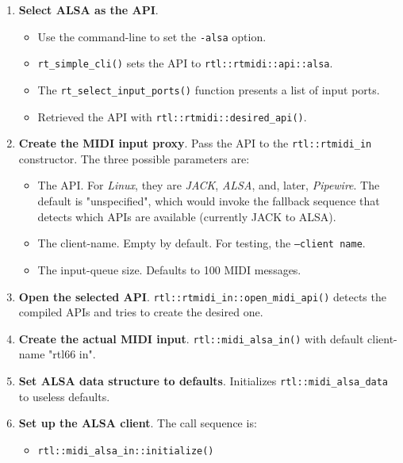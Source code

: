    \begin{enumerate}
      \item \textbf{Select ALSA as the API}.
         \begin{itemize}
            \item Use the command-line to set the \texttt{-\-alsa} option.
            \item \texttt{rt\_simple\_cli()} sets the API to
               \texttt{rtl::rtmidi::api::alsa}.
            \item The \texttt{rt\_select\_input\_ports()} function
               presents a list of input ports.
            \item Retrieved the API with \texttt{rtl::rtmidi::desired\_api()}.
         \end{itemize}
      \item\textbf{Create the MIDI input proxy}.
         Pass the API to the
         \texttt{rtl::rtmidi\_in} constructor.
         The three possible parameters are:
         \begin{itemize}
            \item The API.  For \textsl{Linux}, they are
               \textsl{JACK}, \textsl{ALSA}, and,
               later, \textsl{Pipewire}. The default is "unspecified",
               which would invoke the fallback sequence that
               detects which APIs are available (currently
               JACK to ALSA).
            \item The client-name. Empty by default. For testing,
               the \texttt{--client name}.
            \item The input-queue size. Defaults to 100 MIDI messages.
         \end{itemize}
      \item\textbf{Open the selected API}.
         \texttt{rtl::rtmidi\_in::open\_midi\_api()} detects the compiled
         APIs and tries to create the desired one.
      \item\textbf{Create the actual MIDI input}.
         \texttt{rtl::midi\_alsa\_in()} with default client-name "rtl66 in".
      \item\textbf{Set ALSA data structure to defaults}.
         Initializes \texttt{rtl::midi\_alsa\_data} to useless defaults.
      \item\textbf{Set up the ALSA client}.
         The call sequence is:
         \begin{itemize}
            \item \texttt{rtl::midi\_alsa\_in::initialize()}

\end{itemize}
\end{enumerate}
